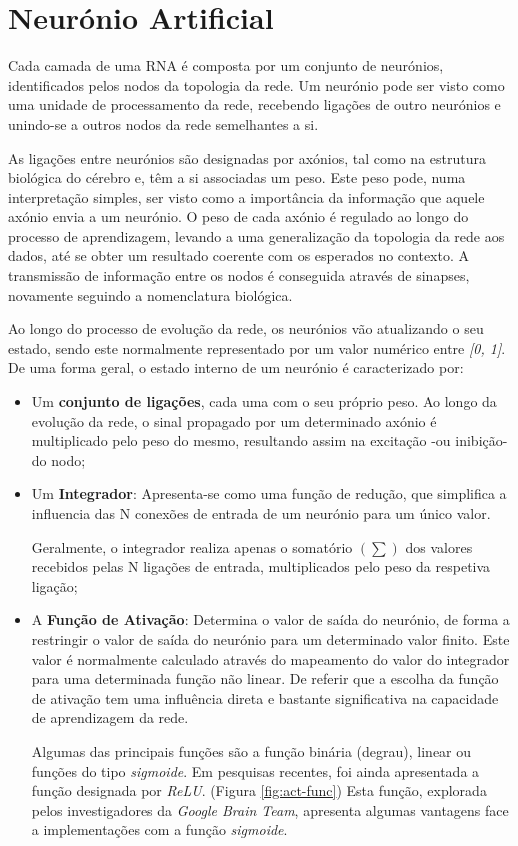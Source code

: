 \section{Neurónio Artificial}
\label{sec:Neuronio}

Cada camada de uma RNA é composta por um conjunto de neurónios, identificados pelos nodos da topologia da rede. 
Um neurónio pode ser visto como uma unidade de processamento da rede, recebendo ligações de outro neurónios e unindo-se a outros nodos da rede semelhantes a si. 

As ligações entre neurónios são designadas por axónios, tal como na estrutura biológica do cérebro e, têm a si associadas um peso. Este peso pode, numa interpretação simples, ser visto como a importância da informação que aquele axónio envia a um neurónio.
O peso de cada axónio é regulado ao longo do processo de aprendizagem, levando a uma generalização da topologia da rede aos dados, até se obter um resultado coerente com os esperados no contexto. 
A transmissão de informação entre os nodos é conseguida através de sinapses, novamente seguindo a nomenclatura biológica. 

Ao longo do processo de evolução da rede, os neurónios vão atualizando o seu estado, sendo este normalmente representado por um valor numérico entre \textit{[0, 1]}.
De uma forma geral, o estado interno de um neurónio é caracterizado por:
\begin{itemize} 
    \item Um \textbf{conjunto de ligações}, cada uma com o seu próprio peso. 
    Ao longo da evolução da rede, o sinal propagado por um determinado axónio é multiplicado pelo peso do mesmo, resultando assim na excitação -ou inibição- do nodo;

    \item Um \textbf{Integrador}: Apresenta-se como uma função de redução, que simplifica a influencia das N conexões de entrada de um neurónio para um único valor. 
    
    Geralmente, o integrador realiza apenas o somatório $(\sum)$ dos valores recebidos pelas N ligações de entrada, multiplicados pelo peso da respetiva ligação;
    
    \item A \textbf{Função de Ativação}: Determina o valor de saída do neurónio, de forma a restringir o valor de saída do neurónio para um determinado valor finito. 
    Este valor é normalmente calculado através do mapeamento do valor do integrador para uma determinada função não linear. De referir que a escolha da função de ativação tem uma influência direta e bastante significativa na capacidade de aprendizagem da rede.  
    
    Algumas das principais funções são a função binária (degrau), linear ou funções do tipo \textit{sigmoide}. \cite{ANN-chemiProb}
    Em pesquisas recentes, foi ainda apresentada a função designada por \textit{ReLU}. (Figura \ref{fig:act-func}) Esta função, explorada pelos investigadores da \textit{Google Brain Team}, apresenta algumas vantagens face a implementações com a função \textit{sigmoide}.

\end{itemize}

